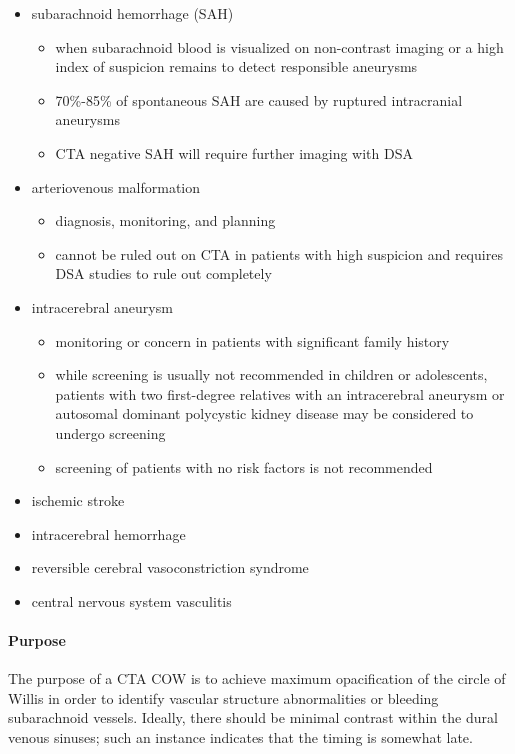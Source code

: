 \begin{itemize}
	\item
	subarachnoid hemorrhage (SAH)
	
	\begin{itemize}
		\item
		when subarachnoid blood is visualized on non-contrast imaging or a high index of suspicion remains to detect responsible aneurysms
		\item
		70\%-85\% of spontaneous SAH are caused by ruptured intracranial aneurysms 
		\item
		CTA negative SAH will require further imaging with DSA
	\end{itemize}
	\item
	arteriovenous malformation
	
	\begin{itemize}
		\item
		diagnosis, monitoring, and planning
		\item
		cannot be ruled out on CTA in patients with high suspicion and requires DSA studies to rule out completely 
	\end{itemize}
	\item
	intracerebral aneurysm
	
	\begin{itemize}
		\item
		\hspace{0pt}monitoring or concern in patients with significant family history
		\item
		while screening is usually not recommended in children or adolescents, patients with two first-degree relatives with an intracerebral aneurysm or autosomal dominant polycystic kidney disease may be considered to undergo screening 
		\item
		screening of patients with no risk factors is not recommended 
	\end{itemize}
	\item
	ischemic stroke
	\item
	intracerebral hemorrhage
	\item
	reversible cerebral vasoconstriction syndrome
	\item
	central nervous system vasculitis
\end{itemize}

\paragraph{Purpose}

The purpose of a CTA COW is to achieve maximum opacification of the circle of Willis in order to identify vascular structure abnormalities or bleeding subarachnoid vessels. Ideally, there should be minimal contrast within the dural venous sinuses; such an instance indicates that the timing is somewhat late.

